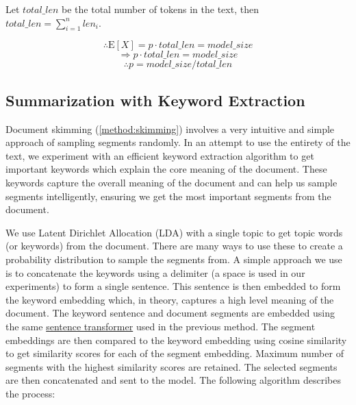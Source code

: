 			Let $total\_len$ be the total number of tokens in the text, then
			$total\_len = \sum_{i = 1}^{n} len_i$.

			\[ \therefore \mathrm{E}[X] = p \cdot total\_len = model\_size \]
			\[ \Rightarrow p \cdot total\_len = model\_size \]
			\[ \therefore p = model\_size / total\_len \]


	\subsection{Summarization with Keyword Extraction}
		\label{method:keyword}

		Document skimming (\ref{method:skimming}) involves a very intuitive and simple approach of
		sampling segments randomly.
		In an attempt to use the entirety of the text, we experiment with an efficient keyword extraction
		algorithm to get important keywords which explain the core meaning of the document.
		These keywords capture the overall meaning of the document and can help us sample segments
		intelligently, ensuring we get the most important segments from the document.

		We use Latent Dirichlet Allocation (LDA) \cite{blei2003latent} with a single topic to get topic
		words (or keywords) from the document.
		There are many ways to use these to create a probability distribution to sample the segments from.
		A simple approach we use is to concatenate the keywords using a delimiter (a space is used in our
		experiments) to form a single sentence.
		This sentence is then embedded to form the keyword embedding which, in theory, captures a high level
		meaning of the document.
		The keyword sentence and document segments are embedded using the same
		\href{https://huggingface.co/sentence-transformers/all-MiniLM-L6-v2}{sentence transformer}
		used in the previous method.
		The segment embeddings are then compared to the keyword embedding using cosine similarity
		to get similarity scores for each of the segment embedding.
		Maximum number of segments with the highest similarity scores are retained.
		The selected segments are then concatenated and sent to the model.
		The following algorithm describes the process:

